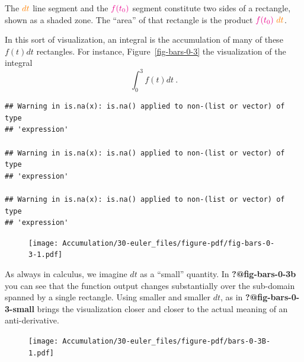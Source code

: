 \documentclass[
  letterpaper,
  DIV=11,
  numbers=noendperiod,
  oneside]{scrreprt}
\begin{document}
The \(\color{orange}{dt}\) line segment and the
\(\color{magenta}{f(t_0)}\) segment constitute two sides of a rectangle,
shown as a shaded zone. The ``area'' of that rectangle is the product
\(\color{magenta}{f(t_0)}\ \color{orange}{dt}\).

In this sort of visualization, an integral is the accumulation of many
of these \(f(t) dt\) rectangles. For instance, Figure~\ref{fig-bars-0-3}
the visualization of the integral \[\int_{0}^3 f(t) dt\ .\]

\begin{verbatim}
## Warning in is.na(x): is.na() applied to non-(list or vector) of type
## 'expression'

## Warning in is.na(x): is.na() applied to non-(list or vector) of type
## 'expression'

## Warning in is.na(x): is.na() applied to non-(list or vector) of type
## 'expression'
\end{verbatim}

\begin{figure}


{\centering \texttt{[image: Accumulation/30-euler\_files/figure-pdf/fig-bars-0-3-1.pdf]}

}

\end{figure}

As always in calculus, we imagine \(dt\) as a ``small'' quantity. In
\textbf{?@fig-bars-0-3b} you can see that the function output changes
substantially over the sub-domain spanned by a single rectangle. Using
smaller and smaller \(dt\), as in \textbf{?@fig-bars-0-3-small} brings
the visualization closer and closer to the actual meaning of an
anti-derivative.

\begin{figure}


{\centering \texttt{[image: Accumulation/30-euler\_files/figure-pdf/bars-0-3B-1.pdf]}

}

\end{figure}
\end{document}
